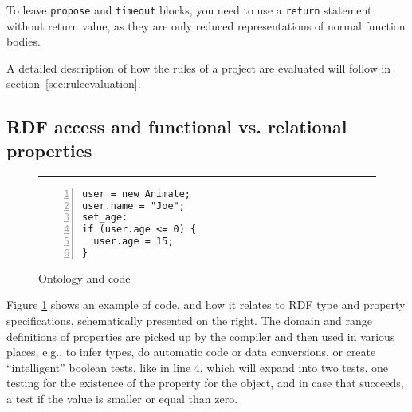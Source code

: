 To leave \texttt{propose} and \texttt{timeout} blocks, you need to use a
\texttt{return} statement without return value, as they are only reduced
representations of normal function bodies.

A detailed description of how the rules of a \vonda project are evaluated will
follow in section~\ref{sec:ruleevaluation}.


\subsection{RDF access and functional vs. relational properties}
\label{sec:rdfaccesses}

\begin{figure}[htb]
\rule{7mm}{0pt}\begin{minipage}{0.45\columnwidth}
\small%
\begin{lstlisting}[numbers=left,numberstyle=\scriptsize]
user = new Animate;
user.name = "Joe";
set_age:
if (user.age <= 0) {
  user.age = 15;
}
\end{lstlisting}
\end{minipage}\vrule\hspace{1ex}
\begin{minipage}{0.44\columnwidth}
    \small{}
\end{minipage}
  \caption{Ontology and \vonda code}
  \label{fig:rdfobjects}
\end{figure}

Figure \ref{fig:rdfobjects} shows an example of \vonda code, and how it relates
to RDF type and property specifications, schematically presented on the right.
The domain and range definitions of properties are picked up by the compiler
and then used in various places, e.g., to infer types, do automatic code or
data conversions, or create ``intelligent'' boolean tests, like in line 4,
which will expand into two tests, one testing for the existence of the property
for the object, and in case that succeeds, a test if the value is smaller or
equal than zero.

